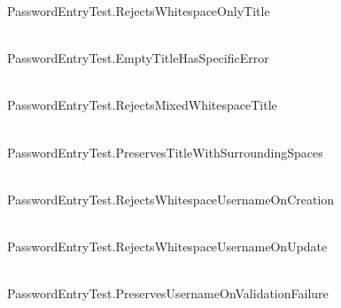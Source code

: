 \begin{DoxyRefList}
\label{test__test000007}%
%
Password\+Entry\+Test.\+Rejects\+Whitespace\+Only\+Title  
\item[{\parbox[t]{\linewidth}{Member \doxylink{_password_entry_test_8cpp_acad25a048bfe095ab346d174e29bc18a}{TEST} (Password\+Entry\+Test, Empty\+Title\+Has\+Specific\+Error)}}]\hfill \\
\label{test__test000008}%
%
Password\+Entry\+Test.\+Empty\+Title\+Has\+Specific\+Error  
\item[{\parbox[t]{\linewidth}{Member \doxylink{_password_entry_test_8cpp_a21f72374c25aa3bf69bfb1d158c444ea}{TEST} (Password\+Entry\+Test, Rejects\+Mixed\+Whitespace\+Title)}}]\hfill \\
\label{test__test000009}%
%
Password\+Entry\+Test.\+Rejects\+Mixed\+Whitespace\+Title  
\item[{\parbox[t]{\linewidth}{Member \doxylink{_password_entry_test_8cpp_a21fbff33068db7f34336f51d5d8e492b}{TEST} (Password\+Entry\+Test, Preserves\+Title\+With\+Surrounding\+Spaces)}}]\hfill \\
\label{test__test000010}%
%
Password\+Entry\+Test.\+Preserves\+Title\+With\+Surrounding\+Spaces  
\item[{\parbox[t]{\linewidth}{Member \doxylink{_password_entry_test_8cpp_ae0e511562e1dfb3261bbf2dee012d9b7}{TEST} (Password\+Entry\+Test, Rejects\+Whitespace\+Username\+On\+Creation)}}]\hfill \\
\label{test__test000011}%
%
Password\+Entry\+Test.\+Rejects\+Whitespace\+Username\+On\+Creation  
\item[{\parbox[t]{\linewidth}{Member \doxylink{_password_entry_test_8cpp_aad73ef7a298382c8beb2de654c1263ca}{TEST} (Password\+Entry\+Test, Rejects\+Whitespace\+Username\+On\+Update)}}]\hfill \\
\label{test__test000012}%
%
Password\+Entry\+Test.\+Rejects\+Whitespace\+Username\+On\+Update  
\item[{\parbox[t]{\linewidth}{Member \doxylink{_password_entry_test_8cpp_a34a4a1f1d026eaddb0aa034821c697bd}{TEST} (Password\+Entry\+Test, Preserves\+Username\+On\+Validation\+Failure)}}]\hfill \\
\label{test__test000013}%
%
Password\+Entry\+Test.\+Preserves\+Username\+On\+Validation\+Failure  
\item[{\parbox[t]{\linewidth}{Member \doxylink{_password_entry_test_8cpp_a5a489d2753dacae588b952e79ba10417}{TEST} (Password\+Entry\+Test, Allows\+Clearing\+Username)}}]\hfill \\

\end{DoxyRefList}
